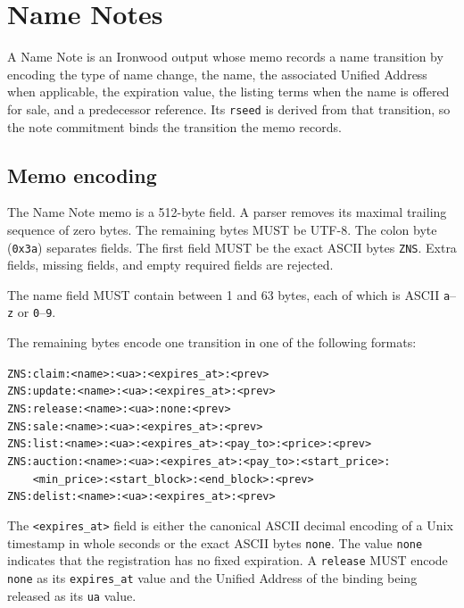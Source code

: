 \section{Name Notes}
\label{sec:name-notes}

A Name Note is an Ironwood output whose memo records a name transition by encoding the type of name change, the name, the associated Unified Address when applicable, the expiration value, the listing terms when the name is offered for sale, and a predecessor reference. Its \texttt{rseed} is derived from that transition, so the note commitment binds the transition the memo records.

\subsection{Memo encoding}

The Name Note memo is a 512-byte field. A parser removes its maximal trailing sequence of zero bytes. The remaining bytes MUST be UTF-8. The colon byte (\texttt{0x3a}) separates fields. The first field MUST be the exact ASCII bytes \texttt{ZNS}. Extra fields, missing fields, and empty required fields are rejected.

The name field MUST contain between 1 and 63 bytes, each of which is ASCII \texttt{a}--\texttt{z} or \texttt{0}--\texttt{9}.

The remaining bytes encode one transition in one of the following formats:

{\small
\begin{flushleft}
\texttt{ZNS:claim:<name>:<ua>:<expires\_at>:<prev>}\\
\texttt{ZNS:update:<name>:<ua>:<expires\_at>:<prev>}\\
\texttt{ZNS:release:<name>:<ua>:none:<prev>}\\
\texttt{ZNS:sale:<name>:<ua>:<expires\_at>:<prev>}\\
\texttt{ZNS:list:<name>:<ua>:<expires\_at>:<pay\_to>:<price>:<prev>}\\
\texttt{ZNS:auction:<name>:<ua>:<expires\_at>:<pay\_to>:<start\_price>:}\\
\texttt{\ \ \ \ <min\_price>:<start\_block>:<end\_block>:<prev>}\\
\texttt{ZNS:delist:<name>:<ua>:<expires\_at>:<prev>}
\end{flushleft}
}

The \texttt{<expires\_at>} field is either the canonical ASCII decimal encoding of a Unix timestamp in whole seconds or the exact ASCII bytes \texttt{none}. The value \texttt{none} indicates that the registration has no fixed expiration. A \texttt{release} MUST encode \texttt{none} as its \texttt{expires\_at} value and the Unified Address of the binding being released as its \texttt{ua} value.

